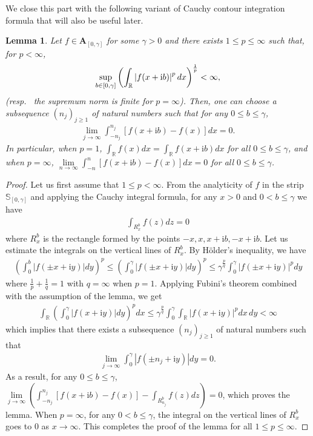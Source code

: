 \documentclass[12pt]{amsart}
\newcommand{\hlabel}{\phantomsection\label}
\numberwithin{equation}{section}
\newcommand{\bb}{\mathbb}
\renewcommand{\ge}{\geqslant}
\renewcommand{\le}{\leqslant}
\renewcommand{\leq}{\leqslant}
\newcommand{\hpt}[2]{#2}
\newcommand{\bmrm}[2][2]{\mathbf{#2}^{#1}}
\newcommand{\A}{\mathbf{A}}
\renewcommand{\i}{\mathrm{i}}
\newtheorem{lem}[thm]{Lemma}
\theoremstyle{definition}
\theoremstyle{assump}
\theoremstyle{remark}
\begin{document}
We close this part with the following variant of Cauchy contour integration formula that will also be useful later.
\begin{lem}\hlabel{prop:contour} Let $f\in\A_{[0,\gamma]}$ for some $\gamma>0$ and there exists $1\le p \leq \infty$ such that\hpt{R6}{, for $p<\infty$,
\begin{align*}
\sup\limits_{b\in [0,\gamma]}\left(\int_{\bb R}\left|f(x+{\rm{i}}b)\right|^p dx\right)^{\frac{1}{p}}<\infty,
\end{align*}
(resp.~ the supremum norm is finite for $p=\infty$).}
Then, one can choose a subsequence $(n_j)_{j\ge 1}$ of natural numbers such that for any $0\le b\le\gamma$,
\begin{align*}
\lim\limits_{j\to\infty}\int_{-n_j}^{n_j} [f(x+\i b)-f(x)]dx=0.
\end{align*}
In particular, when $p=1$, $\int_\bb{R} f(x)dx=\int_{\bb R} f(x+\i b)dx$ for all $0\le b\le \gamma$, and when $p=\infty$, $\lim\limits_{n\to\infty}\int_{-n}^n [f(x+\i b)-f(x)]dx=0$ for all $0\le b\le\gamma$.
\end{lem}
\begin{proof}
	Let us first assume that $1\le p<\infty$. From the analyticity of $f$ in the strip $\bb{S}_{[0,\gamma]}$ and applying the Cauchy integral formula, for any $x>0$ and $0<b\le\gamma$ we have
	\begin{align*}
		\int_{R^b_x} f(z) dz=0
	\end{align*}
where $R^b_x$ is the rectangle formed by the points $-x,x,x+\i b, -x+\i b$. Let us estimate the integrals on the vertical lines of $R^b_x$. By H\"older's inequality, we have
\begin{align*}
		\left(\int_{0}^b |f(\pm x+\i y)|dy\right)^p\le\left(\int_{0}^{\gamma} |f(\pm x+\i y)|dy\right)^p\le \gamma^{\frac{p}{q}}\int_0^\gamma |f(\pm x+\i y)|^p dy
\end{align*}
where $\frac{1}{p}+\frac{1}{q}=1$ with $q=\infty$ when $p=1$. Applying Fubini's theorem combined with the assumption of the lemma, we get
\begin{align*}
	\int_\bb{R}\left(\int_{0}^{\gamma} |f(x+\i y)|dy\right)^p dx\le\gamma^{\frac{p}{q}}\int_0^\gamma\int_{\bb R} |f(x+\i y)|^p dx\,dy<\infty
\end{align*}
which implies that there exists a subsequence $(n_j)_{j\ge 1}$ of natural numbers such that
\begin{align*}
\lim_{j\to\infty}\int_{0}^{\gamma} |f(\pm n_j+\i y)|dy=0.
\end{align*}
As a result, for any $0\le b\le \gamma$,
	$\lim\limits_{j\to\infty}\left(\int_{-n_j}^{n_j} [f(x+\i b)-f(x)]-\int_{R^b_{n_j}} f(z)dz\right)=0$, which proves the lemma. When $p=\infty$, for any $0<b\le\gamma$, the integral on the vertical lines of $R^b_x$ goes to $0$ as $x\to\infty$. This completes the proof of the lemma for all $1\le p\le\infty$.
\end{proof}
\end{document}
